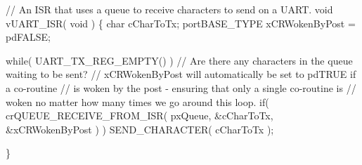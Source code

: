 \begin{DoxyPre}// An ISR that uses a queue to receive characters to send on a UART.
void vUART\_ISR( void )
\{
char cCharToTx;
portBASE\_TYPE xCRWokenByPost = pdFALSE;
\begin{DoxyVerb}while( UART_TX_REG_EMPTY() )
{
    // Are there any characters in the queue waiting to be sent?
 // xCRWokenByPost will automatically be set to pdTRUE if a co-routine
 // is woken by the post - ensuring that only a single co-routine is
 // woken no matter how many times we go around this loop.
    if( crQUEUE_RECEIVE_FROM_ISR( pxQueue, &cCharToTx, &xCRWokenByPost ) )
 {
     SEND_CHARACTER( cCharToTx );
 }
}
\end{DoxyVerb}

\}\end{DoxyPre}
 